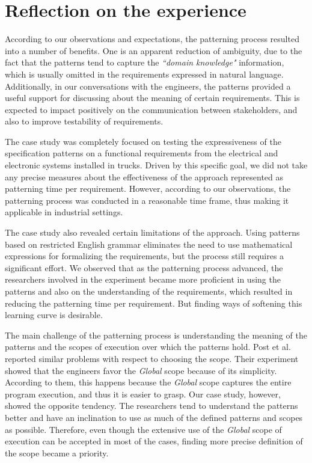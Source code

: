 \documentclass[conference]{IEEEtran}
\begin{document}
\section{Reflection on the experience}

According to our observations and expectations, the patterning process resulted into a number of benefits. One is an apparent reduction of ambiguity, due to the fact that the patterns tend to capture the \textit{``domain knowledge"} information, which is usually omitted in the requirements expressed in natural language. Additionally, in our conversations with the engineers, the patterns provided a useful support for discussing about the meaning of certain requirements. This is expected to impact positively on the communication between stakeholders, and also to improve testability of requirements.

The case study was completely focused on testing the expressiveness of the specification patterns on a functional requirements from the electrical and electronic systems installed in trucks. Driven by this specific goal, we did not take any precise measures about the effectiveness of the approach represented as patterning time per requirement. However, according to our observations, the patterning process was conducted in a reasonable time frame, thus making it applicable in industrial settings.

The case study also revealed certain limitations of the approach. Using patterns based on restricted English grammar eliminates the need to use mathematical expressions for formalizing the requirements, but the process still requires a significant effort. We observed that as the patterning process advanced, the researchers involved in the experiment became more proficient in using the patterns and also on the understanding of the requirements, which resulted in reducing the patterning time per requirement. 
But finding ways of softening this learning curve is desirable.

The main challenge of the patterning process is understanding the meaning of the patterns and the scopes of execution over which the patterns hold.
Post et al. \cite{Post12bosch} reported similar problems with respect to choosing the scope. Their experiment showed that the engineers favor the \textit{Global} scope because of its simplicity. According to them, this happens because the \textit{Global} scope captures the entire program execution, and thus it is easier to grasp.
Our case study, however, showed the opposite tendency. The researchers tend to understand the patterns better and have an inclination to use as much of the defined patterns and scopes as possible. Therefore, even though the extensive use of the \textit{Global} scope of execution can be accepted in most of the cases, finding more precise definition of the scope became a priority.
\end{document}
